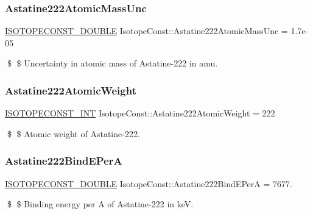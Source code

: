 \subsubsection{\texorpdfstring{Astatine222\+Atomic\+Mass\+Unc}{Astatine222AtomicMassUnc}}
{\footnotesize\ttfamily \mbox{\hyperlink{group___isotope_const-_macros_ga8f45a7272ce02c0b4c65c44636ed719a}{I\+S\+O\+T\+O\+P\+E\+C\+O\+N\+S\+T\+\_\+\+D\+O\+U\+B\+LE}} Isotope\+Const\+::\+Astatine222\+Atomic\+Mass\+Unc = 1.\+7e-\/05}

\$ \$ Uncertainty in atomic mass of Astatine-\/222 in amu. \mbox{\label{group___isotope_const-_astatine-_at222_ga8aa74cc6760d1c637c0503cec11a34d9}} 
\subsubsection{\texorpdfstring{Astatine222\+Atomic\+Weight}{Astatine222AtomicWeight}}
{\footnotesize\ttfamily \mbox{\hyperlink{group___isotope_const-_macros_ga5f18360b3e99483a35c32d789e62621c}{I\+S\+O\+T\+O\+P\+E\+C\+O\+N\+S\+T\+\_\+\+I\+NT}} Isotope\+Const\+::\+Astatine222\+Atomic\+Weight = 222}

\$ \$ Atomic weight of Astatine-\/222. \mbox{\label{group___isotope_const-_astatine-_at222_ga3d4bf1ce9002a98ce5602caf892fca2c}} 
\subsubsection{\texorpdfstring{Astatine222\+Bind\+E\+PerA}{Astatine222BindEPerA}}
{\footnotesize\ttfamily \mbox{\hyperlink{group___isotope_const-_macros_ga8f45a7272ce02c0b4c65c44636ed719a}{I\+S\+O\+T\+O\+P\+E\+C\+O\+N\+S\+T\+\_\+\+D\+O\+U\+B\+LE}} Isotope\+Const\+::\+Astatine222\+Bind\+E\+PerA = 7677.}

\$ \$ Binding energy per A of Astatine-\/222 in keV. \mbox{\label{group___isotope_const-_astatine-_at222_ga59adcca17aca935d4f04ef2403372b6d}} 
